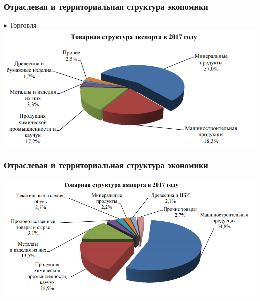 \begin{frame}
\frametitle{Отраслевая и территориальная структура экономики}

$\blacktriangleright$ Торговля\\[20pt]
\includegraphics[width=1\linewidth]{pics/sasha/export}

\end{frame}

\begin{frame}
\frametitle{Отраслевая и территориальная структура экономики}

\includegraphics[width=1\linewidth]{pics/sasha/import}

\end{frame}
